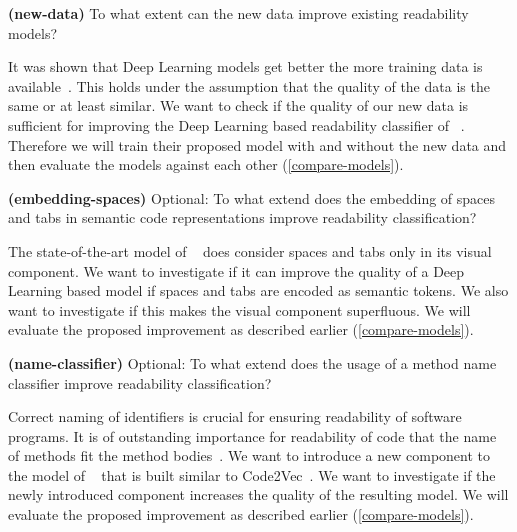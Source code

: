 \documentclass[%
class=scrreprt,
chapterprefix=false,%
open=right,%
twoside=false,%
paper=a4,%
logofile={Logo\_zentral\_farbig\_EN.png},%
thesistype=masterproposal,%
UKenglish,%
]{se2thesis}
\begin{document}
	\begin{resq} \textbf{(new-data)} To what extent can the new data improve existing readability models?\end{resq} \label{new-data}
	It was shown that Deep Learning models get better the more training data is available~\cite{hestness2017deep}. This holds under the assumption that the quality of the data is the same or at least similar. We want to check if the quality of our new data is sufficient for improving the Deep Learning based readability classifier of \citeauthor{mi2022towards}~\cite{mi2022towards}. Therefore we will train their proposed model with and without the new data and then evaluate the models against each other (\ref{compare-models}).
	
	
	\begin{resq} \textbf{(embedding-spaces)} Optional: To what extend does the embedding of spaces and tabs in semantic code representations improve readability classification?\end{resq} \label{embedding-spaces}
	The state-of-the-art model of \citeauthor{mi2022towards}~\cite{mi2022towards} does consider spaces and tabs only in its visual component. We want to investigate if it can improve the quality of a Deep Learning based model if spaces and tabs are encoded as semantic tokens. We also want to investigate if this makes the visual component superfluous. We will evaluate the proposed improvement as described earlier (\ref{compare-models}).
	
	\begin{resq} \textbf{(name-classifier)} Optional: To what extend does the usage of a method name classifier improve readability classification?\end{resq} \label{name-classifier}
	Correct naming of identifiers is crucial for ensuring readability of software programs. It is of outstanding importance for readability of code that the name of methods fit the method bodies~\cite{liu2019learning}. We want to introduce a new component to the model of \citeauthor{mi2022towards}~\cite{mi2022towards} that is built similar to Code2Vec~\cite{alon2019code2vec}. We want to investigate if the newly introduced component increases the quality of the resulting model. We will evaluate the proposed improvement as described earlier (\ref{compare-models}).
	
	\backmatter
	
	\printbibliography
	
\end{document}
